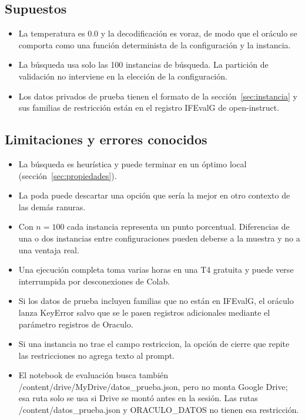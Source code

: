 \documentclass[12pt,letterpaper]{article}
\theoremstyle{definition}
\begin{document}
\subsection{Supuestos}
\begin{itemize}[leftmargin=*]
\item La temperatura es 0.0 y la decodificación es voraz, de modo que el oráculo se comporta como una función determinista de la configuración y la instancia.
\item La búsqueda usa solo las 100 instancias de búsqueda. La partición de validación no interviene en la elección de la configuración.
\item Los datos privados de prueba tienen el formato de la sección~\ref{sec:instancia} y sus familias de restricción están en el registro IFEvalG de open-instruct.
\end{itemize}

\subsection{Limitaciones y errores conocidos}
\begin{itemize}[leftmargin=*]
\item La búsqueda es heurística y puede terminar en un óptimo local (sección~\ref{sec:propiedades}).
\item La poda puede descartar una opción que sería la mejor en otro contexto de las demás ranuras.
\item Con $n = 100$ cada instancia representa un punto porcentual. Diferencias de una o dos instancias entre configuraciones pueden deberse a la muestra y no a una ventaja real.
\item Una ejecución completa toma varias horas en una T4 gratuita y puede verse interrumpida por desconexiones de Colab.
\item Si los datos de prueba incluyen familias que no están en IFEvalG, el oráculo lanza KeyError salvo que se le pasen registros adicionales mediante el parámetro registros de Oraculo.
\item Si una instancia no trae el campo restriccion, la opción de cierre que repite las restricciones no agrega texto al prompt.
\item El notebook de evaluación busca también /content/drive/MyDrive/datos\_prueba.json, pero no monta Google Drive; esa ruta solo se usa si Drive se montó antes en la sesión. Las rutas /content/datos\_prueba.json y ORACULO\_DATOS no tienen esa restricción.
\end{itemize}
\end{document}
